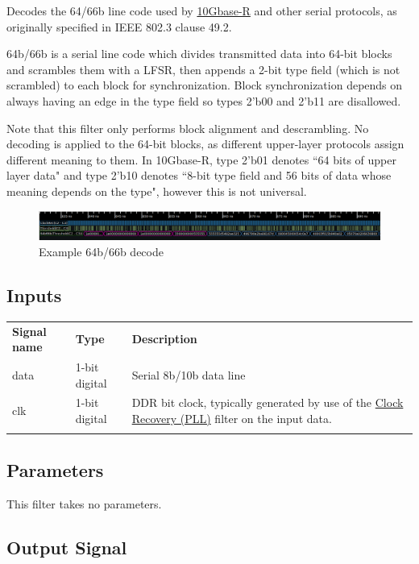 Decodes the 64/66b line code used by \hyperref[filter:10gbaser]{10Gbase-R} and other serial protocols, as originally
specified in IEEE 802.3 clause 49.2.

64b/66b is a serial line code which divides transmitted data into 64-bit blocks and scrambles them with a LFSR, then
appends a 2-bit type field (which is not scrambled) to each block for synchronization. Block synchronization depends on
always having an edge in the type field so types 2'b00 and 2'b11 are disallowed.

Note that this filter only performs block alignment and descrambling. No decoding is applied to the 64-bit blocks, as
different upper-layer protocols assign different meaning to them. In 10Gbase-R, type 2'b01 denotes ``64 bits of upper
layer data" and type 2'b10 denotes ``8-bit type field and 56 bits of data whose meaning depends on the type", however
this is not universal.

\begin{figure}[h]
\centering
\includegraphics[width=16cm]{images/filters/64b66b.png}
\caption{Example 64b/66b decode}
\label{filter_64b66b}
\end{figure}

\subsection{Inputs}

\begin{tabularx}{16cm}{llX}
\thickhline
\textbf{Signal name} & \textbf{Type} & \textbf{Description} \\
\thickhline
data & 1-bit digital & Serial 8b/10b data line \\
\thickhline
clk & 1-bit digital & DDR bit clock, typically generated by use of the \hyperref[filter:cdrpll]{Clock Recovery
(PLL)} filter on the input data.\\
\thickhline
\end{tabularx}

\subsection{Parameters}

This filter takes no parameters.

\subsection{Output Signal}

